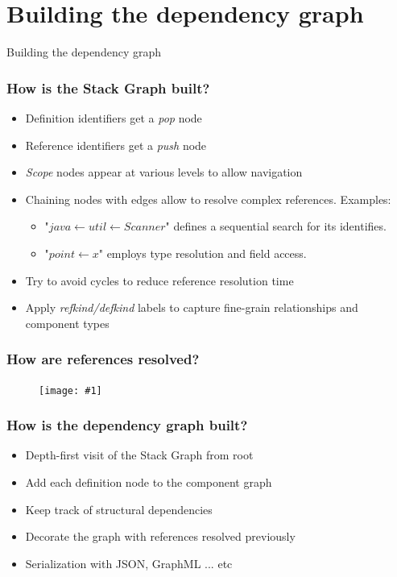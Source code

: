\documentclass[table]{beamer}
\newcommand{\putimage}[2] {
  \begin{figure}[H]
    \centering
    \texttt{[image: \#1]}
	\end{figure}
}
\begin{document}
\section{Building the dependency graph}
\begin{frame}
  \centering
  \huge Building the dependency graph
\end{frame}

\begin{frame}
  \frametitle{How is the Stack Graph built?}
  \begin{itemize}
    \item Definition identifiers get a \textit{pop} node
    \item Reference identifiers get a \textit{push} node
    \item \textit{Scope} nodes appear at various levels to allow navigation
    \item Chaining nodes with edges allow to resolve complex references. Examples:
      \begin{itemize}
        \item "$java \leftarrow util \leftarrow Scanner$" defines a sequential search for its identifies.
        \item "$point \leftarrow x$" employs type resolution and field access.
      \end{itemize}
    \item Try to avoid cycles to reduce reference resolution time
    \item Apply \textit{refkind/defkind} labels to capture fine-grain relationships and component types
  \end{itemize}
\end{frame}

\begin{frame}
  \frametitle{How are references resolved?}
  \putimage{images/mmd/reference-resolution-algorithm.png}{0.60}
\end{frame}

\begin{frame}
  \frametitle{How is the dependency graph built?}
  \begin{itemize}
    \item Depth-first visit of the Stack Graph from root
    \item Add each definition node to the component graph
    \item Keep track of structural dependencies
    \item Decorate the graph with references resolved previously
    \item Serialization with JSON, GraphML ... etc
  \end{itemize}
\end{frame}
\end{document}
